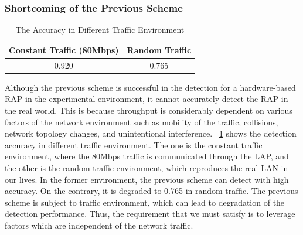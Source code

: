 \documentclass[paper]{ieice}
\begin{document}
\subsubsection{Shortcoming of the Previous Scheme}\label{sec:shortcoming}
\begin{table}[t] 
    \begin{center}
        \caption{The Accuracy in Different Traffic Environment}
        \label{tab:thrput result}
        \begin{tabular}{c c} \hline
            Constant Traffic (80Mbps) & Random Traffic \\ \hline \hline
            0.920 & 0.765 \\ \hline
        \end{tabular}
    \end{center}
    \vspace{-2zh}
\end{table}
Although the previous scheme is successful in the detection for a hardware-based RAP in the experimental environment, it cannot accurately detect the RAP in the real world.
This is because throughput is considerably dependent on various factors of the network environment such as mobility of the traffic, collisions, network topology changes, and unintentional interference.
\tablename~\ref{tab:thrput result} shows the detection accuracy in different traffic environment.
The one is the constant traffic environment, where the 80Mbps traffic is communicated through the LAP, and the other is the random traffic environment, which reproduces the real LAN in our lives.
In the former environment, the previous scheme can detect with high accuracy.
On the contrary, it is degraded to 0.765 in random traffic.
The previous scheme is subject to traffic environment, which can lead to degradation of the detection performance.
Thus, the requirement that we must satisfy is to leverage factors which are independent of the network traffic.
\end{document}
